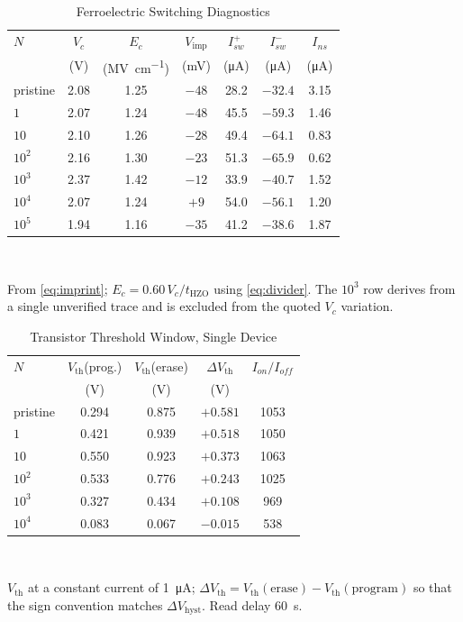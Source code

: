 \documentclass[journal]{IEEEtran}
\newcommand{\rev}[1]{{\color{blue}#1}}      %
\newcommand{\Ec}{E_c}
\newcommand{\Vc}{V_c}
\newcommand{\Vth}{V_{\mathrm{th}}}
\newcommand{\Vimp}{V_{\mathrm{imp}}}
\newcommand{\dVh}{\Delta V_{\mathrm{hyst}}}
\newcommand{\MVcm}{\mega\volt\per\centi\meter}
\begin{document}
\begin{table}[!t]
\caption{Ferroelectric Switching Diagnostics}
\label{tab:switch}\centering\footnotesize\setlength{\tabcolsep}{4pt}
\begin{tabular}{lcccccc}
\toprule
$N$ & $\Vc$ & $\Ec$ & $\Vimp$ & $I_{sw}^{+}$ & $I_{sw}^{-}$ & $I_{ns}$\\
    & (V) & (\si{\MVcm}) & (mV) & (\si{\micro\ampere})
    & (\si{\micro\ampere}) & (\si{\micro\ampere})\\
\midrule
pristine & 2.08 & 1.25 & $-48$ & 28.2 & $-32.4$ & 3.15\\
$1$      & 2.07 & 1.24 & $-48$ & 45.5 & $-59.3$ & 1.46\\
$10$     & 2.10 & 1.26 & $-28$ & 49.4 & $-64.1$ & 0.83\\
$10^2$   & 2.16 & 1.30 & $-23$ & 51.3 & $-65.9$ & 0.62\\
$10^3$   & 2.37 & 1.42 & $-12$ & 33.9 & $-40.7$ & 1.52\\
$10^4$   & 2.07 & 1.24 & $+9$  & 54.0 & $-56.1$ & 1.20\\
$10^5$   & 1.94 & 1.16 & $-35$ & 41.2 & $-38.6$ & 1.87\\
\bottomrule
\end{tabular}\\[2pt]
\parbox{\columnwidth}{\scriptsize From \eqref{eq:imprint};
$\Ec=0.60\,\Vc/t_{\mathrm{HZO}}$ using \eqref{eq:divider}. The $10^3$
row derives from a single unverified trace and is excluded from the
quoted $\Vc$ variation.}
\end{table}

\begin{table}[!t]
\caption{\rev{Transistor Threshold Window, Single Device}}
\label{tab:vth}\centering\footnotesize\setlength{\tabcolsep}{5pt}
\begin{tabular}{lcccc}
\toprule
$N$ & $\Vth$(prog.) & $\Vth$(erase) & $\Delta\Vth$ & $I_{on}/I_{off}$\\
    & (V) & (V) & (V) & \\
\midrule
pristine & 0.294 & 0.875 & $+0.581$ & 1053\\
$1$      & 0.421 & 0.939 & $+0.518$ & 1050\\
$10$     & 0.550 & 0.923 & $+0.373$ & 1063\\
$10^2$   & 0.533 & 0.776 & $+0.243$ & 1025\\
$10^3$   & 0.327 & 0.434 & $+0.108$ & 969\\
$10^4$   & 0.083 & 0.067 & $-0.015$ & 538\\
\bottomrule
\end{tabular}\\[2pt]
\parbox{\columnwidth}{\scriptsize $\Vth$ at a constant current of
\SI{1}{\micro\ampere}; $\Delta\Vth=\Vth(\text{erase})-\Vth(\text{program})$
so that the sign convention matches $\dVh$. Read delay \SI{60}{\second}.}
\end{table}
\end{document}
